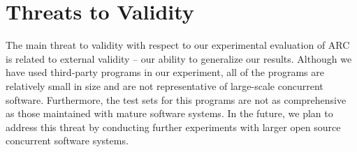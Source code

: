 \section{Threats to Validity}
\label{sec:threats}

The main threat to validity with respect to our experimental evaluation of ARC is related to external validity -- our ability to generalize our results. Although we have used third-party programs in our experiment, all of the programs are relatively small in size and are not representative of large-scale concurrent software. Furthermore, the test sets for this programs are not as comprehensive as those maintained with mature software systems. In the future, we plan to address this threat by conducting further experiments with larger open source concurrent software systems.